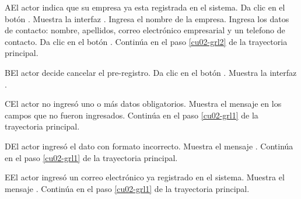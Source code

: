 \begin{UCtrayectoriaA}{A}{El actor indica que su empresa ya esta registrada en el sistema.}
	\UCpaso [\UCactor] Da clic en el botón .
	\UCpaso [\UCsist] Muestra la interfaz .
	\UCpaso [\UCactor] Ingresa el nombre de la empresa.
	\UCpaso [\UCactor] Ingresa los datos de contacto: nombre, apellidos, correo electrónico empresarial y un telefono de contacto.
	\UCpaso [\UCactor] Da clic en el botón . 
	\UCpaso [\UCsist] Continúa en el paso \ref{cu02-grl2} de la trayectoria principal.
\end{UCtrayectoriaA} 

\begin{UCtrayectoriaA}{B}{El actor decide cancelar el pre-registro.}
	\UCpaso [\UCactor] Da clic en el botón .
	\UCpaso [\UCsist] Muestra la interfaz .
\end{UCtrayectoriaA} 

\begin{UCtrayectoriaA}{C}{El actor no ingresó uno o más datos obligatorios.}
	\UCpaso [\UCsist] Muestra el mensaje  en los campos que no
	fueron ingresados.
	\UCpaso [\UCsist] Continúa en el paso \ref{cu02-grl1} de la trayectoria principal.
\end{UCtrayectoriaA} 

\begin{UCtrayectoriaA}{D}{El actor ingresó el dato con formato incorrecto.}
	\UCpaso [\UCsist] Muestra el mensaje .
	\UCpaso [\UCsist] Continúa en el paso \ref{cu02-grl1} de la trayectoria principal.
\end{UCtrayectoriaA} 

\begin{UCtrayectoriaA}{E}{El actor ingresó un correo electrónico ya registrado en el sistema.}
	\UCpaso [\UCsist] Muestra el mensaje .
	\UCpaso [\UCsist] Continúa en el paso \ref{cu02-grl1} de la trayectoria principal.
\end{UCtrayectoriaA} 